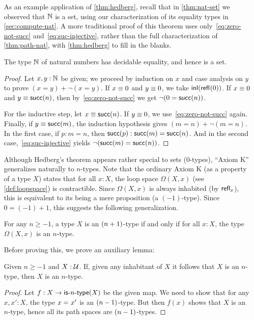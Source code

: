 As an example application of \autoref{thm:hedberg}, recall that in \autoref{thm:nat-set} we observed that $\mathbb{N}$ is a set, using our characterization of its equality types in
\autoref{sec:compute-nat}.
A more traditional proof of this theorem uses only~\eqref{eq:zero-not-succ} and~\eqref{eq:suc-injective}, rather than the full
characterization of \autoref{thm:path-nat}, with \autoref{thm:hedberg} to fill in the blanks.

\begin{thm}\label{prop:nat-is-set}
 The type $\mathbb{N}$ of natural numbers has decidable equality, and hence is a set.
\end{thm}

\begin{proof}
  Let $x, y : \mathbb{N}$ be given; we proceed by induction on $x$ and case analysis on $y$ to prove $(x=y)+\neg(x=y)$.
  If $x \equiv 0$ and $y \equiv 0$, we take ${\mathsf{inl}}(\mathsf{refl}_{}(0))$.
  If $x \equiv 0$ and $y \equiv \mathsf{succ}(n)$, then by~\eqref{eq:zero-not-succ} we get $\neg (0 = \mathsf{succ} (n))$.

  For the inductive step, let $x \equiv \mathsf{succ} (n)$.
  If $y \equiv 0$, we use~\eqref{eq:zero-not-succ} again.
  Finally, if $y \equiv \mathsf{succ} (m)$, the induction hypothesis gives $(m = n)+\neg(m = n)$.
  In the first case, if $p:m=n$, then ${\mathsf{succ}}\mathopen{}\left({p}\right)\mathclose{}:\mathsf{succ}(m)=\mathsf{succ}(n)$.
  And in the second case,~\eqref{eq:suc-injective} yields $\neg(\mathsf{succ}(m)=\mathsf{succ}(n))$.
\end{proof}

Although Hedberg's theorem appears rather special to sets ($0$-types), ``Axiom K'' generalizes naturally to $n$-types.
Note that the ordinary Axiom K (as a property of a type $X$) states that for all $x:X$, the loop space $\Omega(X,x)$ (see \cref{def:loopspace}) is contractible.
Since $\Omega(X,x)$ is always inhabited (by $\mathsf{refl}_{x}$), this is equivalent to its being a mere proposition (a $(-1)$-type).
Since $0 = (-1)+1$, this suggests the following generalization.

\begin{thm}\label{thm:hlevel-loops}
  For any $n\geq -1$, a type $X$ is an $(n+1)$-type if and only if for all $x : X$, the type $\Omega(X, x)$ is an $n$-type.
\end{thm}

Before proving this, we prove an auxiliary lemma:

\begin{lem}\label{lem:hlevel-if-inhab-hlevel}
  Given $n \geq -1$ and $X : \mathcal{U}$.
  If, given any inhabitant of $X$ it follows that $X$ is an $n$-type, then $X$ is an $n$-type.
\end{lem}
\begin{proof}
  Let $f : X \to \mathsf{is}\mbox{-}{n}\mbox{-}\mathsf{type}(X)$ be the given map.
  We need to show that for any $x, x' : X$, the type $x =_{} x'$ is an $(n-1)$-type.
  But then $f(x)$ shows that $X$ is an $n$-type, hence all its path spaces are $(n-1)$-types.
\end{proof}

